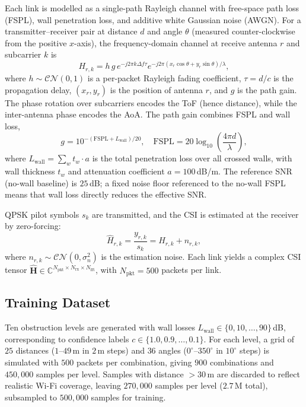 \documentclass[conference]{IEEEtran}
\begin{document}
Each link is modelled as a single-path Rayleigh channel with free-space path
loss (FSPL), wall penetration loss, and additive white Gaussian noise (AWGN).
For a transmitter--receiver pair at distance $d$ and angle $\theta$ (measured
counter-clockwise from the positive $x$-axis), the frequency-domain channel at
receive antenna $r$ and subcarrier $k$ is
\begin{equation}
  H_{r,k} = h\, g \,
    e^{-j 2\pi k \Delta f \tau}
    e^{-j 2\pi\left(x_r \cos\theta + y_r \sin\theta\right)/\lambda},
\label{eq:channel}
\end{equation}
where $h \sim \mathcal{CN}(0,1)$ is a per-packet Rayleigh fading coefficient,
$\tau = d/c$ is the propagation delay, $(x_r,y_r)$ is the position of antenna
$r$, and $g$ is the path gain. The phase rotation over subcarriers encodes the
ToF (hence distance), while the inter-antenna phase encodes the AoA. The path
gain combines FSPL and wall loss,
\begin{equation}
  g = 10^{-\left(\mathrm{FSPL} + L_{\mathrm{wall}}\right)/20},
  \quad
  \mathrm{FSPL} = 20\log_{10}\!\left(\frac{4\pi d}{\lambda}\right),
\label{eq:pathgain}
\end{equation}
where $L_{\mathrm{wall}} = \sum_{w} t_w \cdot a$ is the total penetration loss
over all crossed walls, with wall thickness $t_w$ and attenuation coefficient
$a = 100$\,dB/m. The reference SNR (no-wall baseline) is $25$\,dB; a fixed
noise floor referenced to the no-wall FSPL means that wall loss directly reduces
the effective SNR.

QPSK pilot symbols $s_k$ are transmitted, and the CSI is estimated at the
receiver by zero-forcing:
\begin{equation}
  \hat{H}_{r,k} = \frac{y_{r,k}}{s_k} = H_{r,k} + n_{r,k},
\label{eq:csi}
\end{equation}
where $n_{r,k} \sim \mathcal{CN}(0,\sigma_n^2)$ is the estimation noise. Each
link yields a complex CSI tensor $\hat{\mathbf{H}} \in
\mathbb{C}^{N_{\mathrm{pkt}}\times N_{\mathrm{rx}}\times N_{\mathrm{fft}}}$,
with $N_{\mathrm{pkt}}=500$ packets per link.

\subsection{Training Dataset}
Ten obstruction levels are generated with wall losses
$L_{\mathrm{wall}} \in \{0,10,\dots,90\}$\,dB, corresponding to confidence
labels $c \in \{1.0,0.9,\dots,0.1\}$. For each level, a grid of $25$ distances
($1$--$49$\,m in $2$\,m steps) and $36$ angles ($0^{\circ}$--$350^{\circ}$ in
$10^{\circ}$ steps) is simulated with $500$ packets per combination, giving
$900$ combinations and $450{,}000$ samples per level. Samples with distance
$>30$\,m are discarded to reflect realistic Wi-Fi coverage, leaving
$270{,}000$ samples per level ($2.7$\,M total), subsampled to $500{,}000$
samples for training.
\end{document}
